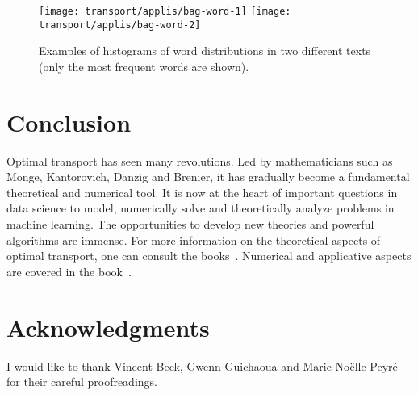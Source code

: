 \begin{figure}\centering
    \texttt{[image: transport/applis/bag-word-1]}
    \qquad
    \texttt{[image: transport/applis/bag-word-2]}
\caption{\label{fig:bagwords} Examples of histograms of word distributions in two different texts (only the most frequent words are shown). }
\end{figure}


\section*{Conclusion}

Optimal transport has seen many revolutions. Led by mathematicians such as Monge, Kantorovich, Danzig and Brenier, it has gradually become a fundamental theoretical and numerical tool.
%
It is now at the heart of important questions in data science to model, numerically solve and theoretically analyze problems in machine learning. The opportunities to develop new theories and powerful algorithms are immense.
%
For more information on the theoretical aspects of optimal transport, one can consult the books~\cite{Villani03, SantambrogioBook}. Numerical and applicative aspects are covered in the book~\cite{PeyreCuturi}.

\section *{Acknowledgments}

I would like to thank Vincent Beck, Gwenn Guichaoua and Marie-No\"elle Peyr\'e for their careful proofreadings.